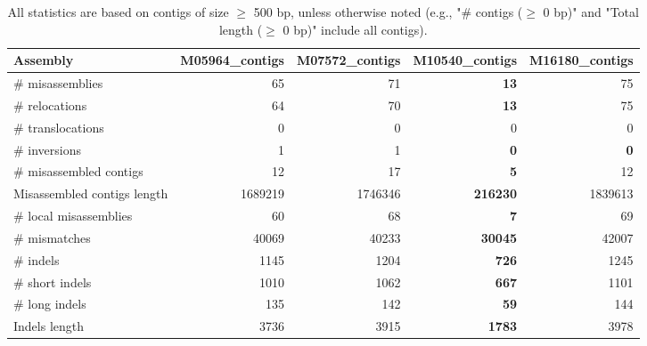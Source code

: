 \documentclass[12pt,a4paper]{article}
\begin{document}
\begin{table}[ht]
\begin{center}
\caption{All statistics are based on contigs of size $\geq$ 500 bp, unless otherwise noted (e.g., "\# contigs ($\geq$ 0 bp)" and "Total length ($\geq$ 0 bp)" include all contigs).}
\begin{tabular}{|l*{4}{|r}|}
\hline
Assembly & M05964\_contigs & M07572\_contigs & M10540\_contigs & M16180\_contigs \\ \hline
\# misassemblies & 65 & 71 & {\bf 13} & 75 \\ \hline
\hspace{5mm}\# relocations & 64 & 70 & {\bf 13} & 75 \\ \hline
\hspace{5mm}\# translocations & 0 & 0 & 0 & 0 \\ \hline
\hspace{5mm}\# inversions & 1 & 1 & {\bf 0} & {\bf 0} \\ \hline
\# misassembled contigs & 12 & 17 & {\bf 5} & 12 \\ \hline
Misassembled contigs length & 1689219 & 1746346 & {\bf 216230} & 1839613 \\ \hline
\# local misassemblies & 60 & 68 & {\bf 7} & 69 \\ \hline
\# mismatches & 40069 & 40233 & {\bf 30045} & 42007 \\ \hline
\# indels & 1145 & 1204 & {\bf 726} & 1245 \\ \hline
\hspace{5mm}\# short indels & 1010 & 1062 & {\bf 667} & 1101 \\ \hline
\hspace{5mm}\# long indels & 135 & 142 & {\bf 59} & 144 \\ \hline
Indels length & 3736 & 3915 & {\bf 1783} & 3978 \\ \hline
\end{tabular}
\end{center}
\end{table}
\end{document}
